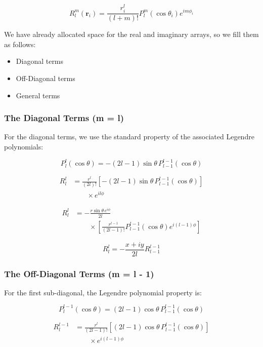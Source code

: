 \[
R_l^m(\mathbf r_i)
=\frac{r_i^l}{(l+m)!}
P_l^m(\cos\theta_i)e^{im\phi_i}
\]

We have already allocated space for the real and imaginary arrays, so we fill them as follows:

\begin{itemize}
    \item Diagonal terms
    \item Off-Diagonal terms
    \item General terms
\end{itemize}

\subsubsection*{The Diagonal Terms (m = l)}

For the diagonal terms, we use the standard property of the associated Legendre polynomials:

\[
P_l^l(\cos\theta)
=-(2l-1)\sin\theta\,P_{l-1}^{l-1}(\cos\theta)
\]

\[
\begin{aligned}
R_l^l
&=\frac{r^l}{(2l)!}
\left[-(2l-1)\sin\theta\,P_{l-1}^{l-1}(\cos\theta)\right]\\
&\qquad\times e^{il\phi}
\end{aligned}
\]

\[
\begin{aligned}
R_l^l
&=-\frac{r\sin\theta\,e^{i\phi}}{2l}\\
&\qquad\times\left[\frac{r^{l-1}}{(2l-1)!}
P_{l-1}^{l-1}(\cos\theta)e^{i(l-1)\phi}\right]
\end{aligned}
\]

\[
R_l^l=-\frac{x+iy}{2l}R_{l-1}^{l-1}
\]

\subsubsection*{The Off-Diagonal Terms (m = l - 1)}

For the first sub-diagonal, the Legendre polynomial property is:

\[
P_l^{l-1}(\cos\theta)
=(2l-1)\cos\theta\,P_{l-1}^{l-1}(\cos\theta)
\]

\[
\begin{aligned}
R_l^{l-1}
&=\frac{r^l}{(2l-1)!}
\left[(2l-1)\cos\theta\,P_{l-1}^{l-1}(\cos\theta)\right]\\
&\qquad\times e^{i(l-1)\phi}
\end{aligned}
\]

